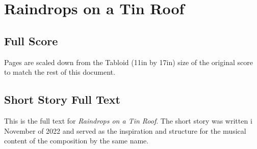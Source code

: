 \section{Raindrops on a Tin Roof}

\subsection{Full Score}
Pages are scaled down from the Tabloid (11in by 17in) size of the original score to match the rest of this document. 

 

\subsection{Short Story Full Text}

This is the full text for \textit{Raindrops on a Tin Roof}. The short story was written i November of 2022 and served as the inspiration and structure for the musical content of the composition by the same name. 








\backmatter


